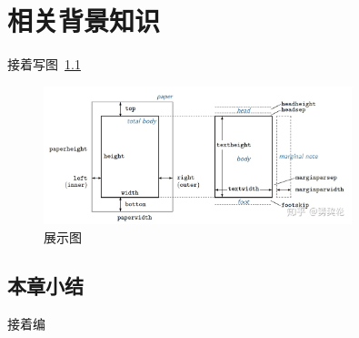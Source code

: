 \chapter{相关背景知识}
\label{ch:related}

接着写图~\ref{fig:geometry}

\begin{figure}[t]
    \centering
    \includegraphics[width=0.8\textwidth]{fig/geometry.jpg}
    \caption{展示图}
    \label{fig:geometry}
\end{figure}

\section{本章小结}

接着编